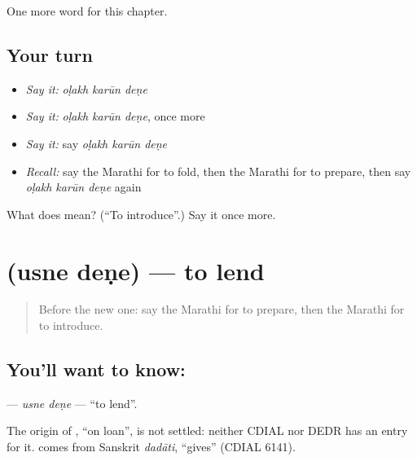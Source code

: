 \begin{grammarlens}[title={What you've built}]
One more word for this chapter.
\end{grammarlens}

\subsection*{Your turn}
\begin{itemize}
\raggedright
  \item \emph{Say it:} \emph{oḷakh karūn deṇe}
  \item \emph{Say it:} \emph{oḷakh karūn deṇe}, once more
  \item \emph{Say it:} say \emph{oḷakh karūn deṇe}
  \item \emph{Recall:} say the Marathi for to fold, then the Marathi for to prepare, then say \emph{oḷakh karūn deṇe} again
\end{itemize}

\begin{tcolorbox}[breakable,colback=teal!4,colframe=teal!35!black,title={Before you move on}]
What does    mean? (\textquotedblleft{}To introduce\textquotedblright{}.) Say it once more.
\end{tcolorbox}
\section[\texorpdfstring{\mr{उसने} \mr{देणे} (usne deṇe)}{उसने देणे (usne deṇe)}]{  (usne deṇe) — to lend}

\label{lesson:MR-C196-usne-dene}



\begin{quote}
Before the new one: say the Marathi for to prepare, then the Marathi for to introduce.
\end{quote}

\subsection*{You'll want to know:  }
\textbf{ } — \emph{usne deṇe} — \textquotedblleft{}to lend\textquotedblright{}.

\begin{cousinweb}
The origin of \textbf{}, \textquotedblleft{}on loan\textquotedblright{}, is not settled: neither CDIAL nor DEDR has an entry for it. \textbf{} comes from Sanskrit \emph{dadāti}, \textquotedblleft{}gives\textquotedblright{} (CDIAL 6141).
\end{cousinweb}

